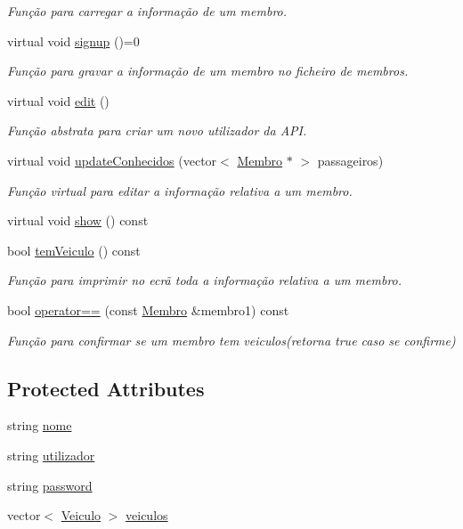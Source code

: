 \begin{DoxyCompactItemize}
\begin{DoxyCompactList}\small\item\em Função para carregar a informação de um membro. \end{DoxyCompactList}\item 
virtual void \hyperlink{class_membro_ab88b510a234c18aa035c28f4253140b3}{signup} ()=0
\begin{DoxyCompactList}\small\item\em Função para gravar a informação de um membro no ficheiro de membros. \end{DoxyCompactList}\item 
virtual void \hyperlink{class_membro_a0e4aef4dc61b9f22b277591249714452}{edit} ()
\begin{DoxyCompactList}\small\item\em Função abstrata para criar um novo utilizador da A\+P\+I. \end{DoxyCompactList}\item 
virtual void \hyperlink{class_membro_a67dab9bc0fd069a6e3204044005c197f}{update\+Conhecidos} (vector$<$ \hyperlink{class_membro}{Membro} $\ast$ $>$ passageiros)
\begin{DoxyCompactList}\small\item\em Função virtual para editar a informação relativa a um membro. \end{DoxyCompactList}\item 
virtual void \hyperlink{class_membro_a9931c13a2894a9a62760a5dddb867997}{show} () const 
\item 
bool \hyperlink{class_membro_a2d507bc34837f55b91510a86d507d8bc}{tem\+Veiculo} () const 
\begin{DoxyCompactList}\small\item\em Função para imprimir no ecrã toda a informação relativa a um membro. \end{DoxyCompactList}\item 
bool \hyperlink{class_membro_a1561028d847eead98b720c339557262c}{operator==} (const \hyperlink{class_membro}{Membro} \&membro1) const 
\begin{DoxyCompactList}\small\item\em Função para confirmar se um membro tem veiculos(retorna true caso se confirme) \end{DoxyCompactList}\end{DoxyCompactItemize}
\subsection*{Protected Attributes}
\begin{DoxyCompactItemize}
\item 
string \hyperlink{class_membro_a2598bbe34ae32a98f41468b2202a9555}{nome}
\item 
string \hyperlink{class_membro_a42cc733ff94ec8d1bbfdacc62dfbb0e7}{utilizador}
\item 
string \hyperlink{class_membro_ae2b12fc3e91efc674c07e735edf4ac21}{password}
\item 
vector$<$ \hyperlink{class_veiculo}{Veiculo} $>$ \hyperlink{class_membro_a7485fc8a9f992a05662866f19b22f74a}{veiculos}
\end{DoxyCompactItemize}


